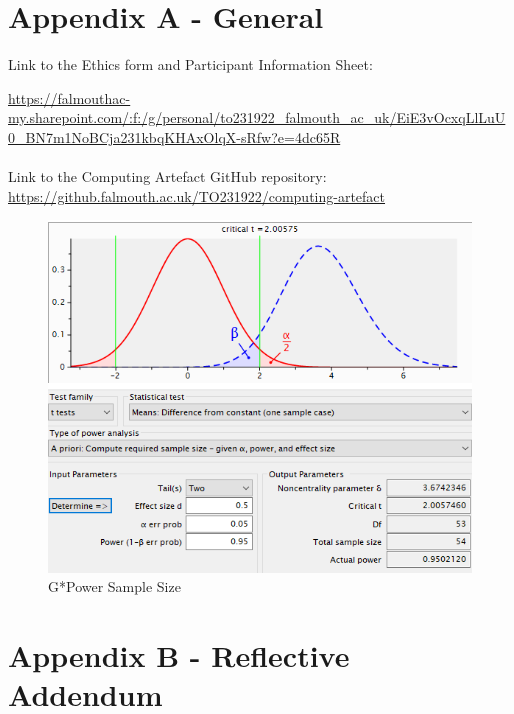 \section*{Appendix A - General} \label{append:a}
Link to the Ethics form and Participant Information Sheet:

\url{https://falmouthac-my.sharepoint.com/:f:/g/personal/to231922_falmouth_ac_uk/EiE3vOcxqLlLuU0_BN7m1NoBCja231kbqKHAxOlqX-sRfw?e=4dc65R}
\\
\\
Link to the Computing Artefact GitHub repository: 
\url{https://github.falmouth.ac.uk/TO231922/computing-artefact}
\begin{figure}[ht]
    \includegraphics[width=\columnwidth]{./Images/gpower.png}
    \centering
    \caption{G*Power Sample Size}
    \label{gpower}
\end{figure}

\section*{Appendix B - Reflective Addendum} \label{append:b}


\newpage
